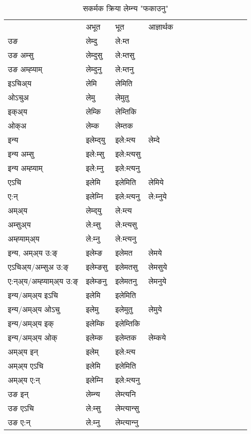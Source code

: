 \begin{table}[H]
\centering
\caption{\label{emt.vt} सकर्मक क्रिया  लेम्‍न्य  "फकाउनु"  }
\begin{tabular}{l|l|l|l|l|l|l|l|l|l|l|l|l}  \toprule
&अभूत & भूत & आज्ञार्थक \\ 
उङ &लेम्दु &ले:म्त \\ 
उङ अम्सु&लेम्दुसु &ले:म्तसु \\ 
उङ अम्ह्‍याम्&लेम्दुनु &ले:म्तनु \\ 
इऽचिअ्य &लेमि &लेमिति   \\ 
ओऽचुअ        &लेमु &लेमुतु   \\ 
इक्अ्य&लेम्कि &लेम्तिकि   \\ 
ओक्अ &लेम्क &लेम्तक   \\ 
इन्य & इलेम्द्‌यु  & इले:म्त्य &लेम्दे  \\ 
इन्य अम्सु& इले:म्सु  & इले:म्त्यसु   \\ 
इन्य अम्ह्‍याम्& इले:म्‍नु  & इले:म्त्यनु   \\ 
एऽचि & इलेमि & इलेमिति &लेमिये    \\ 
ए:न् & इलेम्‍नि  & इले:म्त्यनु &ले:म्‍नुये  \\ 
अम्अ्य & लेम्द्‌यु  & ले:म्त्य  \\ 
अम्सुअ्य & ले:म्सु & ले:म्त्यसु  \\ 
अम्ह्‍याम्अ्य & ले:म्‍नु  & ले:म्त्यनु \\ 
\midrule
इन्य, अम्अ्य उ:ङ्‌ &इलेम्ङ &इलेमत &लेमये \\ 
एऽचिअ्य/अम्सुअ उ:ङ्‌ &इलेम्ङसु &इलेमतसु &लेमसुये \\ 
ए:न्अ्य/अम्ह्‍याम्अ्य उ:ङ्‌ &इलेम्ङनु &इलेमतनु &लेमनुये \\ 
इन्य/अम्अ्य इऽचि &इलेमि &इलेमिति    \\ 
इन्य/अम्अ्य ओऽचु &इलेमु &इलेमुतु  &लेमुये  \\ 
इन्य/अम्अ्य इक् &इलेम्कि &इलेम्तिकि   \\ 
इन्य/अम्अ्य ओक् &इलेम्क &इलेम्तक  &लेम्कये  \\ 
अम्अ्य इन् & इलेम् & इले:म्त्य   \\ 
अम्अ्य एऽचि & इलेमि & इलेमिति    \\ 
अम्अ्य ए:न् & इलेम्‍नि  & इले:म्त्यनु  \\ 
\midrule
उङ इन् & लेम्‍न्य  & लेम्त्यनि  \\ 
उङ एऽचि & ले:म्सु  & लेम्त्यान्सु   \\ 
उङ ए:न्& ले:म्‍नु  & लेम्त्यान्‍नु   \\ 
\bottomrule
\end{tabular}
\end{table}


